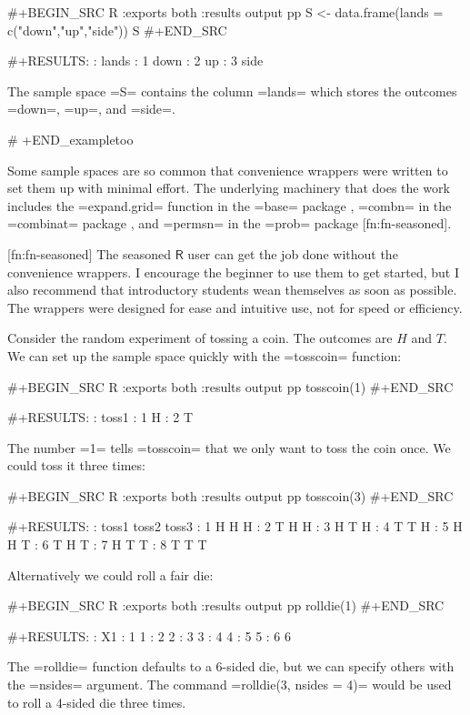 #+BEGIN_SRC R :exports both :results output pp  
S <- data.frame(lands = c("down","up","side"))
S
#+END_SRC

#+RESULTS:
:   lands
: 1  down
: 2    up
: 3  side

The sample space =S= contains the column =lands= which stores the
outcomes =down=, =up=, and =side=.

# +END_exampletoo


Some sample spaces are so common that convenience wrappers were
written to set them up with minimal effort. The underlying machinery
that does the work includes the =expand.grid= function in the =base=
package \cite{base}, =combn= in the =combinat= package
\cite{combinat}, and =permsn= in the =prob= package
\cite{prob}[fn:fn-seasoned].

[fn:fn-seasoned] The seasoned \(\mathsf{R}\) user can get the job done
without the convenience wrappers. I encourage the beginner to use them
to get started, but I also recommend that introductory students wean
themselves as soon as possible. The wrappers were designed for ease
and intuitive use, not for speed or efficiency.

Consider the random experiment of tossing a coin. The outcomes are
\(H\) and \(T\). We can set up the sample space quickly with the
=tosscoin= function:

#+BEGIN_SRC R :exports both :results output pp  
tosscoin(1)
#+END_SRC

#+RESULTS:
:   toss1
: 1     H
: 2     T

The number =1= tells =tosscoin= that we only want to toss the coin
once. We could toss it three times:

#+BEGIN_SRC R :exports both :results output pp  
tosscoin(3)
#+END_SRC

#+RESULTS:
:   toss1 toss2 toss3
: 1     H     H     H
: 2     T     H     H
: 3     H     T     H
: 4     T     T     H
: 5     H     H     T
: 6     T     H     T
: 7     H     T     T
: 8     T     T     T

Alternatively we could roll a fair die: 

#+BEGIN_SRC R :exports both :results output pp  
rolldie(1) 
#+END_SRC

#+RESULTS:
:   X1
: 1  1
: 2  2
: 3  3
: 4  4
: 5  5
: 6  6

The =rolldie= function defaults to a 6-sided die, but we can specify
others with the =nsides= argument. The command =rolldie(3, nsides =
4)= would be used to roll a 4-sided die three times.

